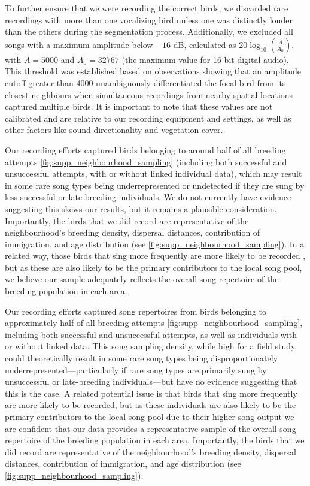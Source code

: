\documentclass[9pt, onecolumn, twoside, lineno]{gsajnl}
\begin{document}
To further ensure that we were recording the correct birds, we discarded rare recordings with more than one vocalizing bird unless one was distinctly louder than the others during the segmentation process. Additionally, we excluded all songs with a maximum amplitude below $-16$ dB, calculated as $20\log_{10}\left(\frac{A}{A_0}\right)$, with $A=5000$ and $A_0=32767$ (the maximum value for 16-bit digital audio). This threshold was established based on observations showing that an amplitude cutoff greater than 4000 unambiguously differentiated the focal bird from its closest neighbours when simultaneous recordings from nearby spatial locations captured multiple birds. It is important to note that these values are not calibrated and are relative to our recording equipment and settings, as well as other factors like sound directionality and vegetation cover.

Our recording efforts captured birds belonging to around half of all breeding attempts \autoref{fig:supp_neighbourhood_sampling} (including both successful and unsuccessful attempts, with or without linked individual data), which may result in some rare song types being underrepresented or undetected if they are sung by less successful or late-breeding individuals. We do not currently have evidence suggesting this skews our results, but it remains a plausible consideration. Importantly, the birds that we did record are representative of the neighbourhood's breeding density, dispersal distances, contribution of immigration, and age distribution (see  \autoref{fig:supp_neighbourhood_sampling}). In a related way, those birds that sing more frequently are more likely to be recorded , but as these are also likely to be the primary contributors to the local song pool, we believe our sample adequately reflects the overall song repertoire of the breeding population in each area.

Our recording efforts captured song repertoires from birds belonging to approximately half of all breeding attempts \autoref{fig:supp_neighbourhood_sampling}, including both successful and unsuccessful attempts, as well as individuals with or without linked data. This song sampling density, while high for a field study, could theoretically result in some rare song types being disproportionately underrepresented—particularly if rare song types are primarily sung by unsuccessful or late-breeding individuals—but have no evidence suggesting that this is the case. A related potential issue is that birds that sing more frequently are more likely to be recorded, but as these individuals are also likely to be the primary contributors to the local song pool due to their higher song output we are confident that our data provides a representative sample of the overall song repertoire of the breeding population in each area. Importantly, the birds that we did record are representative of the neighbourhood's breeding density, dispersal distances, contribution of immigration, and age distribution (see  \autoref{fig:supp_neighbourhood_sampling}).
 
\end{document}
